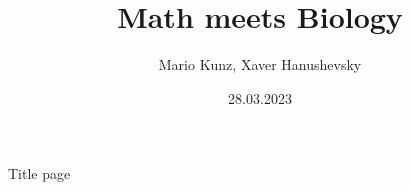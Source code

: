 \documentclass[11pt,aspectratio=169]{beamer}
\title{Math meets Biology}
\date[28.03.2023]{28.03.2023}
\author{Mario Kunz, Xaver Hanushevsky}
\institute{D-BIOL}
\begin{document}
\titleframe

\begin{frame}[fragile]{Title page}

	

\end{frame}
\end{document}
